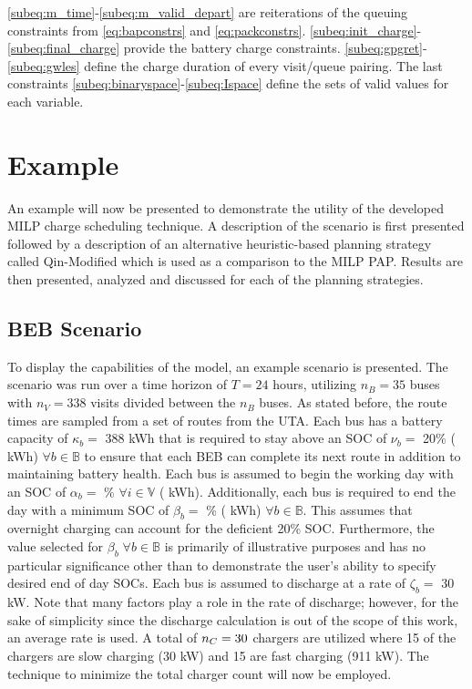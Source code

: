 \documentclass[utf8]{FrontiersinHarvard}
\newcommand{\EDIT}[1]{{\color{blue}#1}}                                         %
\newcommand{\A}{35 }                                                            %
\newcommand{\N}{338 }                                                           %
\newcommand{\acharge}{0.9}                                                      %
\newcommand{\bcharge}{0.7 }                                                     %
\newcommand{\mincharge}{20\% }                                                  %
\newcommand{\minchargeD}{0.20 }                                                 %
\newcommand{\batsize}{388 }                                                     %
\newcommand{\fast}{15 }                                                         %
\newcommand{\slow}{15 }                                                         %
\newcommand{\fasts}{911 }                                                       %
\newcommand{\slows}{30 }                                                        %
\begin{document}
\autoref{subeq:m_time}-\autoref{subeq:m_valid_depart} are reiterations of the queuing constraints \EDIT{from \autoref{eq:bapconstrs}} and \autoref{eq:packconstrs}. \autoref{subeq:init_charge}-\autoref{subeq:final_charge} provide
the battery charge constraints. \autoref{subeq:gpgret}-\autoref{subeq:gwles} define the charge \EDIT{duration} of every
visit/queue pairing. The last constraints \autoref{subeq:binaryspace}-\autoref{subeq:Ispace} define the sets of valid
values for each variable.
\section{Example}
\label{sec:example}
An example will now be presented to demonstrate the utility of the developed MILP charge scheduling technique. A
description of the scenario is first presented followed by a description of an alternative heuristic-based planning
strategy called Qin-Modified which is used as a comparison to the MILP PAP. Results are then presented,
analyzed and discussed for each of the planning strategies.

\subsection{BEB Scenario}
\label{beb-scenario}
To display the capabilities of the model, an example scenario is presented. The scenario was run over a time horizon of
\(T=24\) hours, utilizing \(n_B = \A\) buses with \(n_V = \N\) visits divided between the \(n_B\) buses. As stated before, the
route times are sampled from a set of routes from the UTA. Each bus has a battery capacity of \(\kappa_b =\) \batsize kWh that
is required to stay above an SOC of \(\nu_b =\) \mincharge (\fpeval{\batsize * \minchargeD} kWh) \(\forall b \in
\mathbb{B}\) to ensure that each BEB can complete its next route in addition to maintaining battery health. Each bus is
assumed to begin the working day with an SOC of \(\alpha_b =\) \fpeval{\acharge*100}\% \(\forall i \in \mathbb{V}\)
(\fpeval{\acharge * \batsize} kWh). Additionally, each bus is required to end the day with a minimum SOC of \(\beta_b =\)
\fpeval{\bcharge * 100}\% (\fpeval{\bcharge * \batsize} kWh) \EDIT{$\forall b \in \mathbb{B}$}. This
assumes that overnight charging can account for the deficient 20\% SOC. \EDIT{Furthermore, the value selected for $\beta_b\; \forall b \in \mathbb{B}$ is primarily of illustrative purposes and has no particular significance other than to demonstrate the user's ability to specify desired end of day SOCs.} Each bus is assumed to discharge at a rate of \(\zeta_b
=\) 30 kW. Note that many factors play a role in the rate of discharge; however, for the sake of simplicity since the
discharge calculation is out of the scope of this work, an average rate is used. A total of \(n_C = \fpeval{\fast +
\slow}\) chargers are utilized where \slow of the chargers are slow charging (\slows kW) and \fast are fast charging
(\fasts kW). The technique to minimize the total charger count will now be employed.
\end{document}
